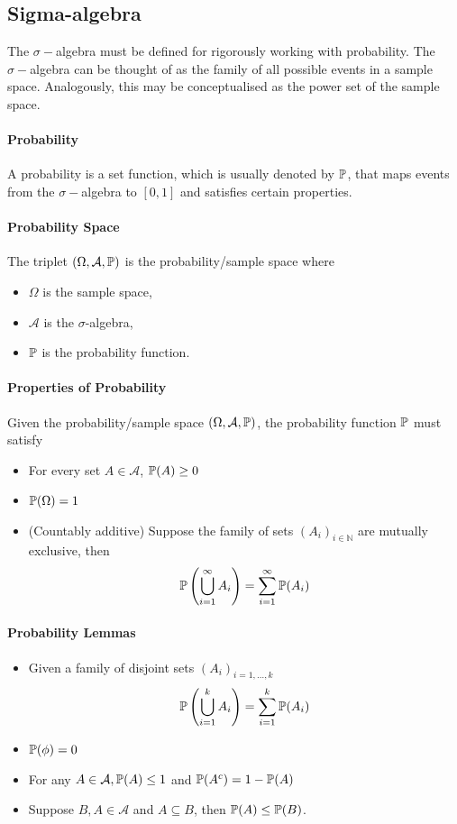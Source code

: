 \subsection{Sigma-algebra}
The \(\sigma-\)algebra must be defined for rigorously working with probability. The \(\sigma-\)algebra can be thought of as the family of all possible events in a sample space. Analogously, this may be conceptualised as the power set of the sample space. 

\paragraph{Probability}
A probability is a set function, which is usually denoted by \(\mathbb{P}\), that maps events from the \(\sigma-\)algebra to \([0,1]\) and satisfies certain properties.

\paragraph{Probability Space}
The triplet \((\Omega, \mathcal{A}, \mathbb{P})\) is the probability/sample space where
\begin{itemize}
    \item \(\Omega\) is the sample space,
    \item \(\mathcal{A}\) is the \(\sigma\)-algebra,
    \item \(\mathbb{P}\) is the probability function.
\end{itemize}

\paragraph {Properties of Probability}
Given the probability/sample space \((\Omega, \mathcal{A}, \mathbb{P})\), the probability
function \(\mathbb{P}\) must satisfy
\begin{itemize}
    \item For every set \(A\in \mathcal{A}\), \(\mathbb{P}(A) \geq 0\)
    \item \(\mathbb{P}(\Omega) = 1\) 
    \item (Countably additive) Suppose the family of sets \((A_i)_{i\in\mathbb{N}}\) are mutually exclusive, then
    \[\mathbb{P} \left(\bigcup_{i=1}^\infty A_i \right) = \sum_{i=1}^\infty \mathbb{P}(A_i)\]
\end{itemize}

\paragraph{Probability Lemmas}
\begin{itemize}
    \item Given a family of disjoint sets \((A_i)_{i=1,\dots,k}\)
    \[\mathbb{P} \left(\bigcup_{i=1}^k A_i \right) = \sum_{i=1}^k \mathbb{P}(A_i) \]
    \item \(\mathbb{P}(\phi) = 0\)
    \item For any \(A\in\mathcal{A}, \mathbb{P}(A) \leq 1\) and \(\mathbb{P}(A^c) = 1 - \mathbb{P}(A)\)
    \item Suppose \(B,A\in \mathcal{A}\) and \(A\subseteq B\), then \(\mathbb{P}(A) \leq \mathbb{P}(B)\).
\end{itemize}


